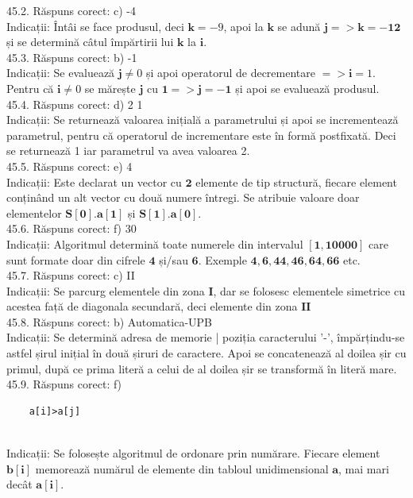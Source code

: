 45.2. Răspuns corect: c) -4\\
Indicații: Întâi se face produsul, deci $\mathbf{k}=-9$, apoi la $\mathbf{k}$ se adună $\mathbf{j}=>\mathbf{k}=\mathbf{- 1 2}$ și se determină câtul împărtirii lui $\mathbf{k}$ la $\mathbf{i}$.\\

45.3. Răspuns corect: b) -1\\
Indicații: Se evaluează $\mathbf{j} \neq 0$ și apoi operatorul de decrementare $=>\mathbf{i}=1$. Pentru că $\mathbf{i} \neq 0$ se mărește $\mathbf{j}$ cu $\mathbf{1} => \mathbf{j=-1}$ și apoi se evaluează produsul.\\

45.4. Răspuns corect: d) 2 1\\
Indicații: Se returnează valoarea inițială a parametrului și apoi se incrementează parametrul, pentru că operatorul de incrementare este în formă postfixată. Deci se returnează 1 iar parametrul va avea valoarea 2.\\

45.5. Răspuns corect: e) 4\\
Indicații: Este declarat un vector cu $\mathbf{2}$ elemente de tip structură, fiecare element conținând un alt vector cu două numere întregi. Se atribuie valoare doar elementelor $\mathbf{S[0].a[1]}$ și $\mathbf{S[1].a[0]}$.\\

45.6. Răspuns corect: f) 30\\
Indicații: Algoritmul determină toate numerele din intervalul $\mathbf{[1, 10000]}$ care sunt formate doar din cifrele $\mathbf{4}$ și/sau $\mathbf{6}$. Exemple $\mathbf{4, 6, 44, 46, 64, 66}$ etc.\\

45.7. Răspuns corect: c) II\\
Indicații: Se parcurg elementele din zona $\mathbf{I}$, dar se folosesc elementele simetrice cu acestea față de diagonala secundară, deci elemente din zona $\mathbf{II}$\\

45.8. Răspuns corect: b) Automatica-UPB\\
Indicații: Se determină adresa de memorie | poziția caracterului '-', împărțindu-se astfel șirul inițial în două șiruri de caractere. Apoi se concatenează al doilea șir cu primul, după ce prima literă a celui de al doilea șir se transformă în literă mare.\\

45.9. Răspuns corect: f) \begin{verbatim}
    a[i]>a[j]
\end{verbatim}\\
Indicații: Se folosește algoritmul de ordonare prin numărare. Fiecare element $\mathbf{b[i]}$ memorează numărul de elemente din tabloul unidimensional $\mathbf{a}$, mai mari decât $\mathbf{a[i]}$.\\


